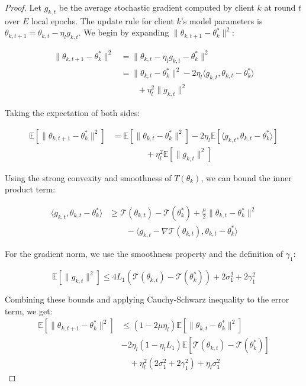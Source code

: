 \documentclass[lettersize,journal]{IEEEtran}
\newtheorem{proof}{Proof}
\begin{document}
\begin{proof}
Let $g_{k,t}$ be the average stochastic gradient computed by client $k$ at round $t$ over $E$ local epochs. The update rule for client $k$'s model parameters is $\theta_{k,t+1} = \theta_{k,t} - \eta_l g_{k,t}$. We begin by expanding $\|\theta_{k,t+1} - \theta_k^*\|^2$:

\begin{align*}
\|\theta_{k,t+1} - \theta_k^*\|^2 &= \|\theta_{k,t} - \eta_l g_{k,t} - \theta_k^*\|^2 \\
&= \|\theta_{k,t} - \theta_k^*\|^2 - 2\eta_l \langle g_{k,t}, \theta_{k,t} - \theta_k^* \rangle\\ 
& \qquad+ \eta_l^2 \|g_{k,t}\|^2
\end{align*}

Taking the expectation of both sides:

\begin{align*}
\mathbb{E}[\|\theta_{k,t+1} - \theta_k^*\|^2] &= \mathbb{E}[\|\theta_{k,t} - \theta_k^*\|^2] - 2\eta_l \mathbb{E}[\langle g_{k,t}, \theta_{k,t} - \theta_k^* \rangle]\\ 
& \qquad \qquad + \eta_l^2 \mathbb{E}[\|g_{k,t}\|^2]
\end{align*}

Using the strong convexity and smoothness of $T(\theta_k)$, we can bound the inner product term:

\begin{align*}
\langle g_{k,t}, \theta_{k,t} - \theta_k^* \rangle &\geq \mathcal{T}(\theta_{k,t}) - \mathcal{T}(\theta_k^*) + \frac{\mu}{2}\|\theta_{k,t} - \theta_k^*\|^2\\ 
&\qquad - \langle g_{k,t} - \nabla \mathcal{T}(\theta_{k,t}), \theta_{k,t} - \theta_k^* \rangle
\end{align*}

For the gradient norm, we use the smoothness property and the definition of $\gamma_1$:

\begin{equation}
\mathbb{E}[\|g_{k,t}\|^2] \leq 4L_1(\mathcal{T}(\theta_{k,t}) - \mathcal{T}(\theta_k^*)) + 2\sigma_1^2 + 2\gamma_1^2
\end{equation}

Combining these bounds and applying Cauchy-Schwarz inequality to the error term, we get:
\begin{align*}
\mathbb{E}[\|\theta_{k,t+1} - \theta_k^*\|^2] &\leq (1 - 2\mu\eta_l)\mathbb{E}[\|\theta_{k,t} - \theta_k^*\|^2]\\ 
&- 2\eta_l(1 - \eta_l L_1)\mathbb{E}[\mathcal{T}(\theta_{k,t}) - \mathcal{T}(\theta_k^*)] \\
&\quad + \eta_l^2(2\sigma_1^2 + 2\gamma_1^2) + \eta_l\sigma_1^2
\end{align*}


\end{proof}
\end{document}

